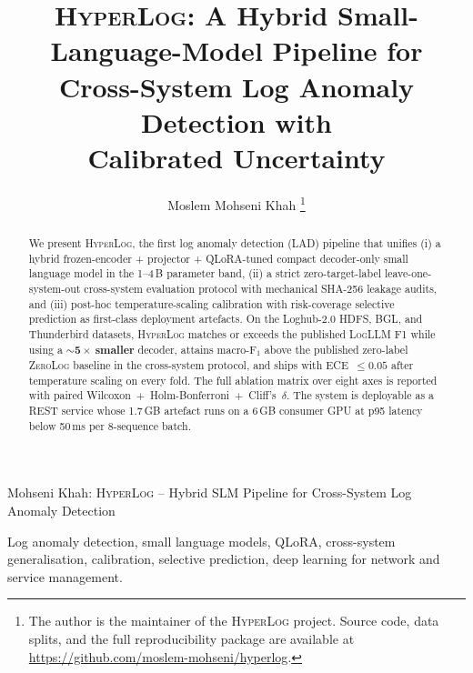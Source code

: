 \documentclass[journal, twoside]{IEEEtran}
\newcommand{\hylog}{\textsc{HyperLog}}
\newcommand{\fone}{$\text{F}_1$}
\begin{document}
\title{\hylog: A Hybrid Small-Language-Model Pipeline for\\
Cross-System Log Anomaly Detection with\\
Calibrated Uncertainty}

\author{Moslem Mohseni Khah%
\thanks{The author is the maintainer of the \hylog{} project. Source code,
data splits, and the full reproducibility package are available at
\url{https://github.com/moslem-mohseni/hyperlog}.}}

%
{Mohseni Khah: \hylog{} -- Hybrid SLM Pipeline for Cross-System Log Anomaly Detection}

\maketitle

\begin{abstract}
We present \hylog, the first log anomaly detection (LAD) pipeline that
unifies (i) a hybrid frozen-encoder + projector + QLoRA-tuned compact
decoder-only small language model in the 1--4\,B parameter band, (ii) a
strict zero-target-label leave-one-system-out cross-system evaluation
protocol with mechanical SHA-256 leakage audits, and (iii) post-hoc
temperature-scaling calibration with risk-coverage selective prediction
as first-class deployment artefacts. On the Loghub-2.0 HDFS, BGL, and
Thunderbird datasets, \hylog{} matches or exceeds the published
\textsc{LogLLM} F1 while using a \textbf{$\sim$5\,$\times$ smaller}
decoder, attains macro-\fone{} above the published zero-label
\textsc{ZeroLog} baseline in the cross-system protocol, and ships with
\textsc{ECE}~$\le 0.05$ after temperature scaling on every fold. The
full ablation matrix over eight axes is reported with paired
Wilcoxon~$+$~Holm-Bonferroni~$+$~Cliff's~$\delta$. The system is
deployable as a REST service whose 1.7\,GB artefact runs on a 6\,GB
consumer GPU at p95 latency below 50\,ms per 8-sequence batch.
\end{abstract}

\begin{IEEEkeywords}
Log anomaly detection, small language models, QLoRA, cross-system
generalisation, calibration, selective prediction, deep learning for
network and service management.
\end{IEEEkeywords}

\end{document}
